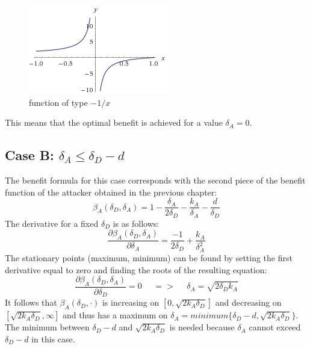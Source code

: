 \begin{figure}[hbtp]
\centering
\includegraphics[scale=1]{Images/1x.png}
\caption{function of type $-1/x$}
\label{1xx}
\end{figure}

This means that the optimal benefit is achieved for a value $\delta_{A}=0$.





\subsection*{Case B: $ \delta_{A} \leq \delta_{D} -d$ }
The benefit formula for this case corresponds with the second piece of the benefit function of the attacker obtained in the previous chapter:
\begin{equation*}
\beta_{A}(\delta_{D},\delta_{A}) =1- \dfrac{\delta_{A}}{2\delta_{D}} - \dfrac{k_{A}}{\delta_{A}} - \dfrac{d}{\delta_{D}}
\end{equation*}
The derivative for a fixed $\delta_{D}$ is as follows:
\begin{equation*}
\dfrac{\partial \beta_{A}(\delta_{D},\delta_{A})}{\partial \delta_{A}} = \dfrac{-1}{2\delta_{D}} + \dfrac{k_{A}}{\delta_{A}^{2}}
\end{equation*}
The stationary points (maximum, minimum) can be found by setting the first derivative equal to zero and finding the roots of the resulting equation:
\begin{equation*}
\frac{\partial \beta_{A}(\delta_{D},\delta_{A})}{\partial \delta_{D}} =0 ~~~~~~ =>~~~~~~ \delta_{A} = \sqrt{2\delta_{D}k_{A}}
\end{equation*}
It follows that $\beta_{A}(\delta_{D},\cdot)$ is increasing on $[0,\sqrt{2k_{A}\delta_{D}}]$ and decreasing on $[\sqrt{2k_{A}\delta_{D}}, \infty]$ and thus has a maximum on $\delta_{A} = minimum \{\delta_{D} -d, \sqrt{2k_{A}\delta_{D}} \} $. The minimum between $\delta_{D}-d$ and $ \sqrt{2k_{A}\delta_{D}}$ is needed because $\delta_{A} $ cannot exceed $\delta_{D}-d$ in this case. \\


